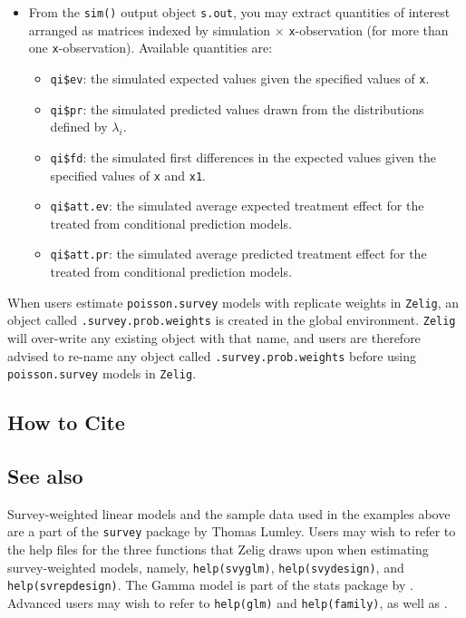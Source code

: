 \begin{itemize}
\item From the {\tt sim()} output object {\tt s.out}, you may extract
  quantities of interest arranged as matrices indexed by simulation
  $\times$ {\tt x}-observation (for more than one {\tt x}-observation).
  Available quantities are:

   \begin{itemize}
   \item {\tt qi\$ev}: the simulated expected values given the
     specified values of {\tt x}.
   \item {\tt qi\$pr}: the simulated predicted values drawn from the
     distributions defined by $\lambda_i$.
   \item {\tt qi\$fd}: the simulated first differences in the expected
     values given the specified values of {\tt x} and {\tt x1}.
   \item {\tt qi\$att.ev}: the simulated average expected treatment
     effect for the treated from conditional prediction models.  
   \item {\tt qi\$att.pr}: the simulated average predicted treatment
     effect for the treated from conditional prediction models.  
   \end{itemize}
\end{itemize}

When users estimate {\tt poisson.survey} models with replicate weights in {\tt Zelig}, an 
object called {\tt .survey.prob.weights} is created in the global environment.  
{\tt Zelig} will over-write any existing object with that name, and users 
are therefore advised to re-name any object called {\tt .survey.prob.weights} before using {\tt poisson.survey} models in {\tt Zelig}.


\subsection* {How to Cite}


 
 
 \subsection* {See also}
 
 Survey-weighted linear models and the sample data used in the
 examples above are a part of the {\tt survey} package by Thomas
 Lumley. Users may wish to refer to the help files for the three
 functions that Zelig draws upon when estimating survey-weighted
 models, namely, {\tt help(svyglm)}, {\tt help(svydesign)}, and {\tt
 help(svrepdesign)}.  The Gamma model is part of the stats package
 by \citet{VenRip02}. Advanced users may wish to refer to
 \texttt{help(glm)} and \texttt{help(family)}, as well as
 \cite{McCNel89}.
